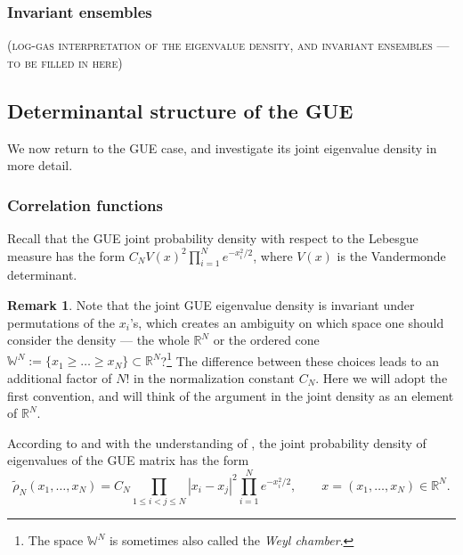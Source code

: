 \documentclass[letterpaper,11pt,oneside,reqno]{amsart}
\numberwithin{equation}{section}
\newcommand{\note}[1]{\textsc{\color{blue}(#1)}}
\newcommand{\lect}[1]{}
\theoremstyle{definition}
\newtheorem{remark}[proposition]{Remark}
\begin{document}

\subsubsection{Invariant ensembles} %
\label{ssub:invariant_ensembles}

\note{log-gas interpretation of the eigenvalue density, and invariant ensembles --- to be filled in here}



\lect{2/10/2016}

\subsection{Determinantal structure of the GUE} %
\label{sub:determinantal_structure_of_the_gue}
We now return to the GUE case, and investigate 
its joint eigenvalue density in more detail. 

\subsubsection{Correlation functions} %
\label{ssub:correlation_functions}

Recall that the GUE joint probability density 
with respect to the Lebesgue measure has the form
$C_N V(x)^2 \prod_{i=1}^{N} e^{-x_i^2/2}$,
where $V(x)$ is the Vandermonde determinant.
\begin{remark}\label{rmk:ordering}
	Note that the joint GUE eigenvalue density is invariant under permutations
	of the $x_i$'s, which creates an ambiguity on which space one should consider the 
	density --- the whole $\mathbb{R}^{N}$ or the ordered cone 
	$\mathbb{W}^{N}:=\{x_1\ge \ldots\ge x_N\}\subset\mathbb{R}^{N}$?\footnote{The space
	$\mathbb{W}^{N}$ is sometimes also called the \emph{Weyl chamber}.} 
	The difference between these choices leads to an additional factor of $N!$ in the normalization
	constant $C_N$.
	Here we will adopt the first 
	convention, and will think of the argument in 
	the joint density as an element of $\mathbb{R}^{N}$.
\end{remark}
According to 
and with the understanding of
, the joint probability density of eigenvalues
of the GUE matrix has the form
\begin{equation}\label{GUE_density}
	\tilde \rho_N(x_1,\ldots,x_N)=C_N \prod_{1\le i<j\le N}|x_i-x_j|^{2} \prod_{i=1}^{N} e^{-x_i^2/2},\qquad
	x=(x_1,\ldots,x_N)\in\mathbb{R}^{N}.
\end{equation}
\end{document}
